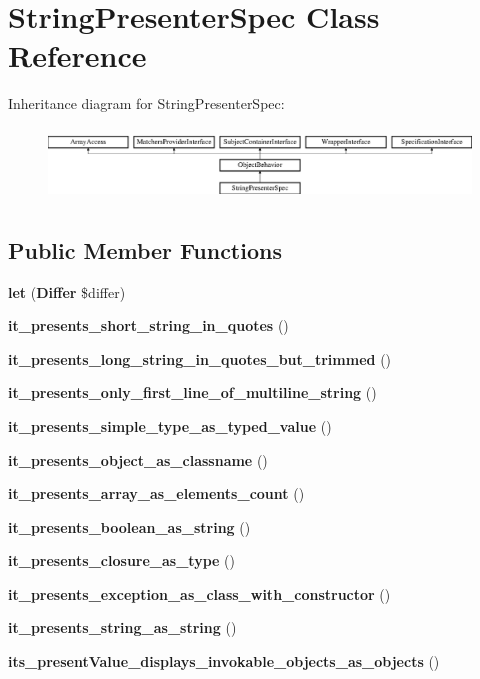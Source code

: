 \section{String\+Presenter\+Spec Class Reference}
\label{classspec_1_1_php_spec_1_1_formatter_1_1_presenter_1_1_string_presenter_spec}
Inheritance diagram for String\+Presenter\+Spec\+:\begin{figure}[H]
\begin{center}
\leavevmode
\includegraphics[height=1.953488cm]{classspec_1_1_php_spec_1_1_formatter_1_1_presenter_1_1_string_presenter_spec}
\end{center}
\end{figure}
\subsection*{Public Member Functions}
\begin{DoxyCompactItemize}
\item 
{\bf let} ({\bf Differ} \$differ)
\item 
{\bf it\+\_\+presents\+\_\+short\+\_\+string\+\_\+in\+\_\+quotes} ()
\item 
{\bf it\+\_\+presents\+\_\+long\+\_\+string\+\_\+in\+\_\+quotes\+\_\+but\+\_\+trimmed} ()
\item 
{\bf it\+\_\+presents\+\_\+only\+\_\+first\+\_\+line\+\_\+of\+\_\+multiline\+\_\+string} ()
\item 
{\bf it\+\_\+presents\+\_\+simple\+\_\+type\+\_\+as\+\_\+typed\+\_\+value} ()
\item 
{\bf it\+\_\+presents\+\_\+object\+\_\+as\+\_\+classname} ()
\item 
{\bf it\+\_\+presents\+\_\+array\+\_\+as\+\_\+elements\+\_\+count} ()
\item 
{\bf it\+\_\+presents\+\_\+boolean\+\_\+as\+\_\+string} ()
\item 
{\bf it\+\_\+presents\+\_\+closure\+\_\+as\+\_\+type} ()
\item 
{\bf it\+\_\+presents\+\_\+exception\+\_\+as\+\_\+class\+\_\+with\+\_\+constructor} ()
\item 
{\bf it\+\_\+presents\+\_\+string\+\_\+as\+\_\+string} ()
\item 
{\bf its\+\_\+present\+Value\+\_\+displays\+\_\+invokable\+\_\+objects\+\_\+as\+\_\+objects} ()
\end{DoxyCompactItemize}
